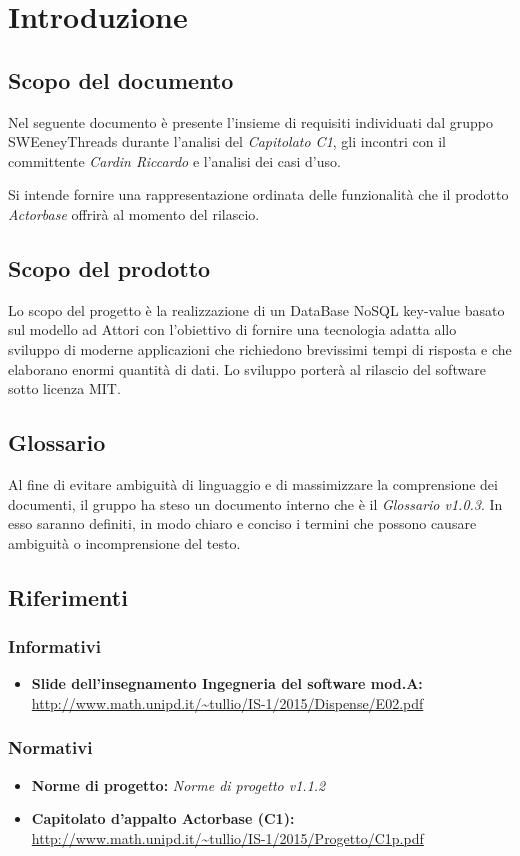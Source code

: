 \documentclass[a4paper]{article}
\begin{document}
	\newpage \section{Introduzione}
	\subsection{Scopo del documento}
		Nel seguente documento è presente l'insieme di requisiti individuati dal gruppo 
		SWEeneyThreads durante l'analisi del \emph{Capitolato C1}, gli incontri con il committente 
		\emph{Cardin Riccardo} e l'analisi dei casi d'uso. 
		
		Si intende fornire una rappresentazione ordinata delle funzionalità che il prodotto \emph{Actorbase} 
		offrirà al momento del rilascio.
	\subsection{Scopo del prodotto}
		Lo scopo del progetto è la realizzazione di un DataBase NoSQL key-value basato sul modello ad 
		Attori con l'obiettivo di fornire una tecnologia adatta allo sviluppo di moderne 
		applicazioni che richiedono brevissimi tempi di risposta e che elaborano enormi quantità 
		di dati. Lo sviluppo porterà al rilascio del software sotto licenza MIT.
	\subsection{Glossario}
		Al fine di evitare ambiguità di linguaggio e di massimizzare la comprensione dei documenti, il 
      gruppo ha steso un documento interno che è il \emph{Glossario v1.0.3}. In esso saranno definiti, in modo
      chiaro e conciso i termini che possono causare ambiguità o incomprensione del testo.
	\subsection{Riferimenti}
	\subsubsection{Informativi}	
		\begin{itemize}
			\item \textbf{Slide dell'insegnamento Ingegneria del software mod.A:} \\
			\url{http://www.math.unipd.it/~tullio/IS-1/2015/Dispense/E02.pdf}
		\end{itemize}
	\subsubsection{Normativi}
		\begin{itemize}
			\item \textbf{Norme di progetto:} \emph{Norme di progetto v1.1.2}
			\item \textbf{Capitolato d'appalto Actorbase (C1):} \\ 
			\url{http://www.math.unipd.it/~tullio/IS-1/2015/Progetto/C1p.pdf}
		\end{itemize}
		
\end{document}
